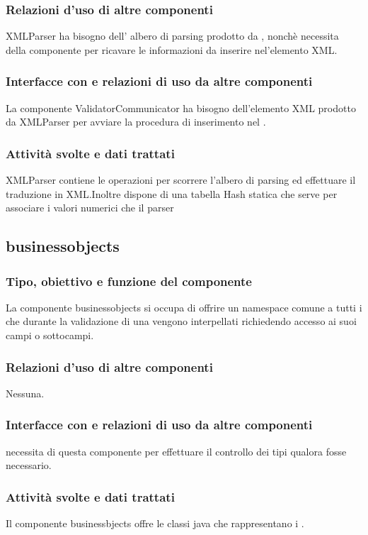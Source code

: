 \documentclass[11pt,titlepage,a4paper]{report}
\begin{document}
\subsubsection{Relazioni d'uso di altre componenti}
XMLParser ha bisogno dell' albero di parsing prodotto da \brp, nonch\`e necessita della componente \br per ricavare le informazioni da inserire nel'elemento XML.
\subsubsection{Interfacce con e relazioni di uso da altre componenti}
La componente ValidatorCommunicator ha bisogno dell'elemento XML prodotto da XMLParser per avviare la procedura di inserimento nel \re.
\subsubsection{Attivit\`a svolte e dati trattati}
XMLParser contiene le operazioni per scorrere l'albero di parsing ed effettuare il traduzione in XML.Inoltre dispone di una tabella Hash statica che serve per associare i valori numerici che il parser 

\subsection{businessobjects}%
\subsubsection{Tipo, obiettivo e funzione del componente}
La componente businessobjects si occupa di offrire un namespace comune a tutti i \bos che durante la validazione di una \br vengono interpellati richiedendo accesso ai suoi campi o sottocampi.
\subsubsection{Relazioni d'uso di altre componenti}
Nessuna.
\subsubsection{Interfacce con e relazioni di uso da altre componenti}
\brp necessita di questa componente per effettuare il controllo dei tipi qualora fosse necessario.
\subsubsection{Attivit\`a svolte e dati trattati}
Il componente businessbjects offre le classi java che rappresentano i \bos.
\end{document}
